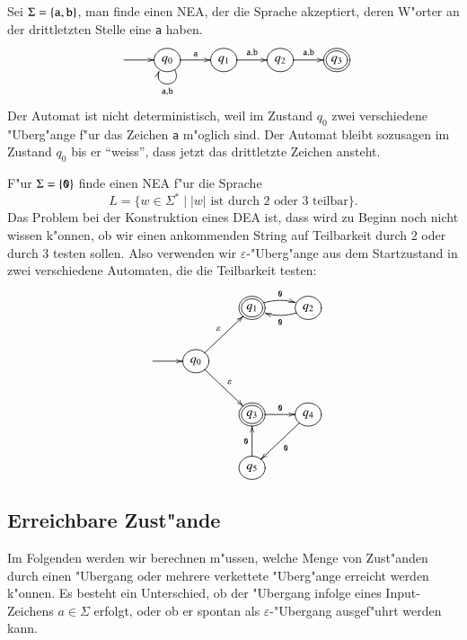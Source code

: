 \begin{beispiel}
Sei $\Sigma=\{{\tt a},{\tt b}\}$, man finde einen NEA, der die 
Sprache akzeptiert, deren W"orter an der drittletzten Stelle
eine {\tt a} haben.
\[
\entrymodifiers={++[o][F]}
\xymatrix{
*+\txt{} \ar[r]
	&{q_0} \ar[r]^{\tt a} \ar@(dr,dl)^{{\tt a},{\tt b}}
		&{q_1}\ar[r]^{{\tt a},{\tt b}}
			&{q_2}\ar[r]^{{\tt a},{\tt b}}
				&*++[o][F=]{q_3}
}
\]
Der Automat ist nicht deterministisch, weil im Zustand $q_0$ zwei verschiedene
"Uberg"ange f"ur das Zeichen {\tt a} m"oglich sind. Der Automat bleibt
sozusagen im Zustand $q_0$ bis er ``weiss'', dass jetzt das drittletzte
Zeichen ansteht.
\end{beispiel}

\begin{beispiel}[\bf Teilbarkeit]
F"ur $\Sigma=\{{\tt 0}\}$ finde einen NEA f"ur die Sprache 
\[
L=\{w\in \Sigma^*\;|\; \text{$|w|$ ist durch 2 oder 3 teilbar}\}.
\]
Das Problem bei der Konstruktion eines DEA ist, dass wird zu
Beginn noch nicht wissen k"onnen, ob wir einen ankommenden
String auf Teilbarkeit durch $2$ oder durch $3$ testen sollen.
Also verwenden wir $\varepsilon$-"Uberg"ange aus dem Startzustand
in zwei verschiedene Automaten, die die Teilbarkeit testen:
\[
\entrymodifiers={++[o][F]}
\xymatrix{
*+\txt{}
	&*+\txt{}
		&*++[o][F=]{q_1} \ar@/^/[r]^{\tt 0}
			&{q_2} \ar@/^/[l]^{\tt 0}
\\
*+\txt{} \ar[r]
	&{q_0}\ar[ur]^{\varepsilon} \ar[dr]^{\varepsilon}
\\
*+\txt{}
	&*+\txt{}
		&*++[o][F=]{q_3}\ar[r]^{\tt 0}
			&{q_4}\ar[dl]^{\tt 0}
\\
*+\txt{}
	&*+\txt{}
		&{q_5}\ar[u]^{\tt 0}
}
\]
\end{beispiel}

\subsection{Erreichbare Zust"ande\label{regulaer:erreichbarezustaende}}
Im Folgenden werden wir berechnen m"ussen, welche Menge von Zust"anden
durch einen "Ubergang oder mehrere verkettete "Uberg"ange erreicht werden
k"onnen.  Es besteht ein Unterschied, ob der "Ubergang infolge eines
Input-Zeichens $a\in\Sigma$ erfolgt, oder ob er spontan als
$\varepsilon$-"Ubergang ausgef"uhrt werden kann.

